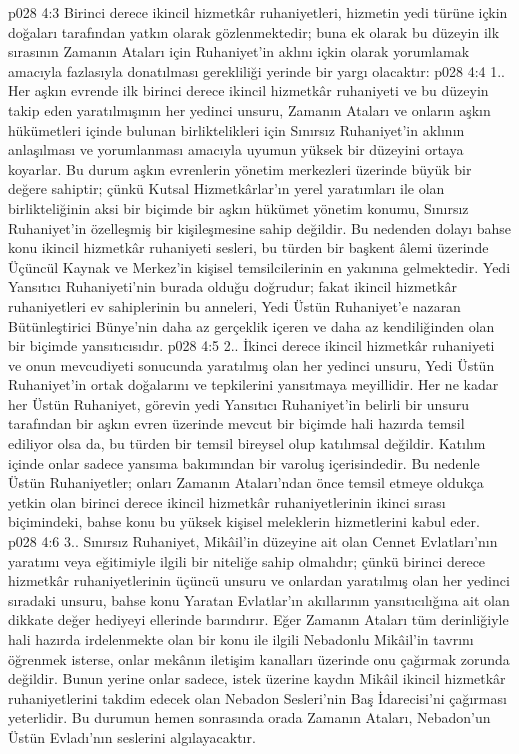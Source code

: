 \vs p028 4:3 Birinci derece ikincil hizmetkâr ruhaniyetleri, hizmetin yedi türüne içkin doğaları tarafından yatkın olarak gözlenmektedir; buna ek olarak bu düzeyin ilk sırasının Zamanın Ataları için Ruhaniyet’in aklını içkin olarak yorumlamak amacıyla fazlasıyla donatılması gerekliliği yerinde bir yargı olacaktır:
\vs p028 4:4 1.\bibnobreakspace {}. Her aşkın evrende ilk birinci derece ikincil hizmetkâr ruhaniyeti ve bu düzeyin takip eden yaratılmışının her yedinci unsuru, Zamanın Ataları ve onların aşkın hükümetleri içinde bulunan birliktelikleri için Sınırsız Ruhaniyet’in aklının anlaşılması ve yorumlanması amacıyla uyumun yüksek bir düzeyini ortaya koyarlar. Bu durum aşkın evrenlerin yönetim merkezleri üzerinde büyük bir değere sahiptir; çünkü Kutsal Hizmetkârlar’ın yerel yaratımları ile olan birlikteliğinin aksi bir biçimde bir aşkın hükümet yönetim konumu, Sınırsız Ruhaniyet’in özelleşmiş bir kişileşmesine sahip değildir. Bu nedenden dolayı bahse konu ikincil hizmetkâr ruhaniyeti sesleri, bu türden bir başkent âlemi üzerinde Üçüncül Kaynak ve Merkez’in kişisel temsilcilerinin en yakınına gelmektedir. Yedi Yansıtıcı Ruhaniyeti’nin burada olduğu doğrudur; fakat ikincil hizmetkâr ruhaniyetleri ev sahiplerinin bu anneleri, Yedi Üstün Ruhaniyet’e nazaran Bütünleştirici Bünye’nin daha az gerçeklik içeren ve daha az kendiliğinden olan bir biçimde yansıtıcısıdır.
\vs p028 4:5 2.\bibnobreakspace {}. İkinci derece ikincil hizmetkâr ruhaniyeti ve onun mevcudiyeti sonucunda yaratılmış olan her yedinci unsuru, Yedi Üstün Ruhaniyet’in ortak doğalarını ve tepkilerini yansıtmaya meyillidir. Her ne kadar her Üstün Ruhaniyet, görevin yedi Yansıtıcı Ruhaniyet’in belirli bir unsuru tarafından bir aşkın evren üzerinde mevcut bir biçimde hali hazırda temsil ediliyor olsa da, bu türden bir temsil bireysel olup katılımsal değildir. Katılım içinde onlar sadece yansıma bakımından bir varoluş içerisindedir. Bu nedenle Üstün Ruhaniyetler; onları Zamanın Ataları’ndan önce temsil etmeye oldukça yetkin olan birinci derece ikincil hizmetkâr ruhaniyetlerinin ikinci sırası biçimindeki, bahse konu bu yüksek kişisel meleklerin hizmetlerini kabul eder.
\vs p028 4:6 3.\bibnobreakspace {}. Sınırsız Ruhaniyet, Mikâil’in düzeyine ait olan Cennet Evlatları’nın yaratımı veya eğitimiyle ilgili bir niteliğe sahip olmalıdır; çünkü birinci derece hizmetkâr ruhaniyetlerinin üçüncü unsuru ve onlardan yaratılmış olan her yedinci sıradaki unsuru, bahse konu Yaratan Evlatlar’ın akıllarının yansıtıcılığına ait olan dikkate değer hediyeyi ellerinde barındırır. Eğer Zamanın Ataları tüm derinliğiyle hali hazırda irdelenmekte olan bir konu ile ilgili Nebadonlu Mikâil’in tavrını öğrenmek isterse, onlar mekânın iletişim kanalları üzerinde onu çağırmak zorunda değildir. Bunun yerine onlar sadece, istek üzerine kaydın Mikâil ikincil hizmetkâr ruhaniyetlerini takdim edecek olan Nebadon Sesleri’nin Baş İdarecisi’ni çağırması yeterlidir. Bu durumun hemen sonrasında orada Zamanın Ataları, Nebadon’un Üstün Evladı’nın seslerini algılayacaktır.
